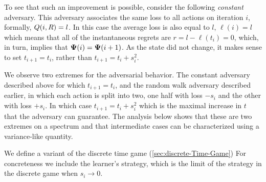 \documentclass{article}[12pt]
\begin{document}
To see that such an improvement is possible, consider the following
{\em constant} adversary. This adversary associates the same loss to
all actions on iteration $i$, formally, $Q(i,R) = l$. In this
case the average loss is also equal to $l$, $\ell(i)=l$ which means
that all of the instantaneous regrets are $r=l-\ell(t_i) = 0$, which,
in turn, implies that ${\bf \Psi}(i) = {\bf \Psi}(i+1)$. As the state did not
change, it makes sense to set $t_{i+1}=t_i$, rather than
$t_{i+1}=t_i+s_i^2$.

We observe two extremes for the adversarial behavior. The constant
adversary described above for which $t_{i+1} = t_i$, and the random walk adversary described
earlier, in which each action is split into two, one half with loss
$-s_i$ and the other with loss $+s_i$. In which case $t_{i+1} =
t_i+s_i^2$ which is the maximal increase in $t$ that the adversary can
guarantee. The analysis below shows that these are two extremes on a
spectrum and that intermediate cases can be characterized using a
variance-like quantity.

We define a variant of the discrete time game
(\ref{sec:discrete-Time-Game}) For concreteness we include the
learner's strategy, which is the limit of the strategy in the discrete
game when $s_i \to 0$.
\end{document}
